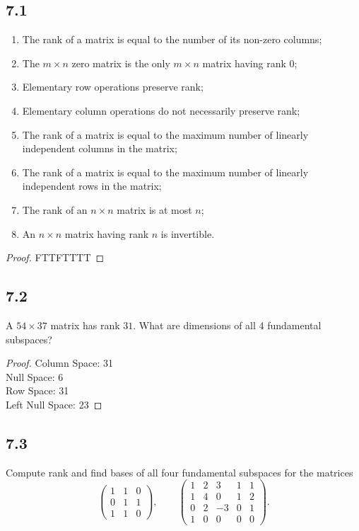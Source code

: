 \documentclass{amsart}
\begin{document}
\subsection*{7.1}
\begin{enumerate}[label=\alph*)]
  \item The rank of a matrix is equal to the number of its non-zero columns;
  \item The $m \times n$ zero matrix is the only $m \times n$ matrix having rank $0$;
  \item Elementary row operations preserve rank;
  \item Elementary column operations do not necessarily preserve rank;
  \item The rank of a matrix is equal to the maximum number of linearly independent columns in the matrix;
  \item The rank of a matrix is equal to the maximum number of linearly independent rows in the matrix;
  \item The rank of an $n \times n$ matrix is at most $n$;
  \item An $n \times n$ matrix having rank $n$ is invertible.
\end{enumerate}
\begin{proof}
  FTTFTTTT
\end{proof}
\subsection*{7.2}
A $54 \times 37$ matrix has rank $31$. What are dimensions of all 4 fundamental subspaces?
\begin{proof}
    Column Space: 31 \\
    Null Space: 6 \\
    Row Space: 31 \\ 
    Left Null Space: 23
\end{proof}
\subsection*{7.3}
Compute rank and find bases of all four fundamental subspaces for the matrices
\[
\begin{pmatrix}
1 & 1 & 0\\
0 & 1 & 1\\
1 & 1 & 0
\end{pmatrix},
\qquad
\begin{pmatrix}
1 & 2 & 3 & 1 & 1\\
1 & 4 & 0 & 1 & 2\\
0 & 2 & -3 & 0 & 1\\
1 & 0 & 0 & 0 & 0
\end{pmatrix}.
\]
\end{document}
